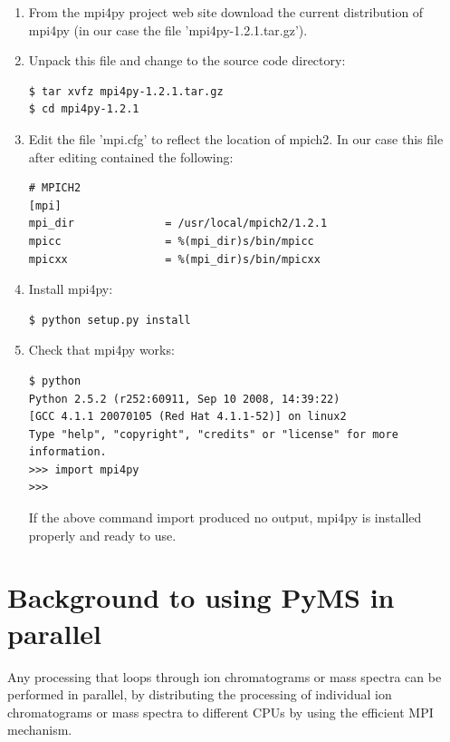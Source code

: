 \begin{enumerate}

\item From the mpi4py project web site download the current distribution
of mpi4py (in our case the file 'mpi4py-1.2.1.tar.gz').

\item Unpack this file and change to the source code directory:

\begin{verbatim}
$ tar xvfz mpi4py-1.2.1.tar.gz
$ cd mpi4py-1.2.1
\end{verbatim}

\item Edit the file 'mpi.cfg' to reflect the location of mpich2.  In
our case this file after editing contained the following:

\begin{verbatim}
# MPICH2
[mpi]
mpi_dir              = /usr/local/mpich2/1.2.1
mpicc                = %(mpi_dir)s/bin/mpicc
mpicxx               = %(mpi_dir)s/bin/mpicxx
\end{verbatim}

\item Install mpi4py:

\begin{verbatim}
$ python setup.py install
\end{verbatim}

\item Check that mpi4py works:

\begin{verbatim}
$ python
Python 2.5.2 (r252:60911, Sep 10 2008, 14:39:22) 
[GCC 4.1.1 20070105 (Red Hat 4.1.1-52)] on linux2
Type "help", "copyright", "credits" or "license" for more information.
>>> import mpi4py
>>> 
\end{verbatim}

If the above command import produced no output, mpi4py is installed
properly and ready to use.

\end{enumerate}

\section{\label{sec:parallel-background}Background to using PyMS in parallel}

Any processing that loops through ion chromatograms or mass spectra can
be performed in parallel, by distributing the processing of individual
ion chromatograms or mass spectra to different CPUs by using the
efficient MPI mechanism.


